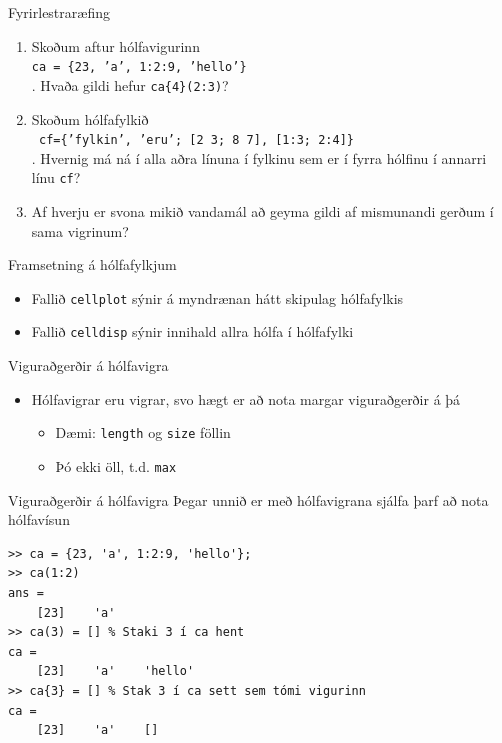 \documentclass{beamer}
\begin{document}
\begin{frame}[fragile]{Fyrirlestraræfing}
\begin{enumerate}
 \item Skoðum aftur hólfavigurinn\\ \texttt{ca = \{23, 'a', 1:2:9, 'hello'\} }\\
 . Hvaða gildi hefur \texttt{ca\{4\}(2:3)}?
 \item Skoðum hólfafylkið\\
\texttt{ cf=\{'fylkin', 'eru'; [2 3; 8 7], [1:3; 2:4]\} }\\
. Hvernig má ná í alla aðra línuna í fylkinu sem er í fyrra hólfinu í annarri línu \texttt{cf}?
 \item Af hverju er svona mikið vandamál að geyma gildi af mismunandi gerðum í sama vigrinum?
\end{enumerate}
\end{frame}

\begin{frame}{Framsetning á hólfafylkjum}
\begin{itemize}
 \item Fallið \texttt{cellplot} sýnir á myndrænan hátt skipulag hólfafylkis
 \item Fallið \texttt{celldisp} sýnir innihald allra hólfa í hólfafylki
\end{itemize}
\end{frame}

\begin{frame}{Viguraðgerðir á hólfavigra}
\begin{itemize}
 \item Hólfavigrar eru vigrar, svo hægt er að nota margar viguraðgerðir á þá
 \begin{itemize}
  \item Dæmi: \texttt{length} og \texttt{size} föllin
  \item Þó ekki öll, t.d. \texttt{max}
 \end{itemize}
\end{itemize}
\end{frame}

\begin{frame}[fragile]{Viguraðgerðir á hólfavigra}
Þegar unnið er með hólfavigrana sjálfa þarf að nota hólfavísun
\begin{verbatim}
>> ca = {23, 'a', 1:2:9, 'hello'};
>> ca(1:2)
ans = 
    [23]    'a'
>> ca(3) = [] % Staki 3 í ca hent
ca = 
    [23]    'a'    'hello'
>> ca{3} = [] % Stak 3 í ca sett sem tómi vigurinn
ca = 
    [23]    'a'    []
\end{verbatim}
\end{frame}
\end{document}
